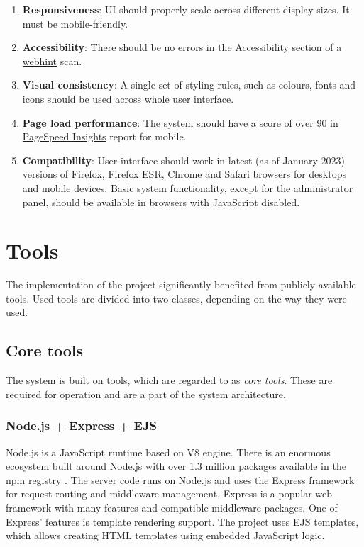 \begin{enumerate}
	\item \textbf{Responsiveness}: UI should properly scale across different display sizes. It must be mobile-friendly.

	\item \textbf{Accessibility}: There should be no errors in the Accessibility section of a \href{https://webhint.io/}{webhint} scan.

	\item \textbf{Visual consistency}: A single set of styling rules, such as colours, fonts and icons should be used across whole user interface.

	\item \textbf{Page load performance}: The system should have a score of over 90 in \href{https://pagespeed.web.dev}{PageSpeed Insights} report for mobile.

	\item \textbf{Compatibility}: User interface should work in latest (as of January 2023) versions of Firefox, Firefox ESR, Chrome and Safari browsers for desktops and mobile devices. Basic system functionality, except for the administrator panel, should be available in browsers with JavaScript disabled.
\end{enumerate}

\section{Tools}

The implementation of the project significantly benefited from publicly available tools. Used tools are divided into two classes, depending on the way they were used.

\subsection{Core tools}

The system is built on tools, which are regarded to as \textit{core tools}. These are required for operation and are a part of the system architecture.

\subsubsection{Node.js + Express + EJS}

Node.js is a JavaScript runtime based on V8 engine. There is an enormous ecosystem built around Node.js with over 1.3 million packages available in the npm registry \cite{bib:npm-packages}. The server code runs on Node.js and uses the Express framework for request routing and middleware management. Express is a popular web framework with many features and compatible middleware packages. One of Express' features is template rendering support. The project uses EJS templates, which allows creating HTML templates using embedded JavaScript logic.

